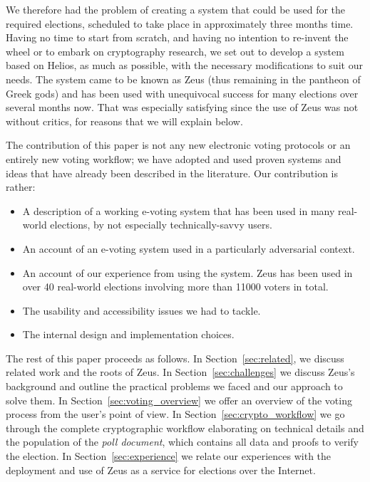 \documentclass[letterpaper,10pt]{article}
\begin{document}
We therefore had the problem of creating a system that could be used
for the required elections, scheduled to take place in approximately
three months time. Having no time to start from scratch, and having
no intention to re-invent the wheel or to embark on cryptography
research, we set out to develop a system based on Helios, as much as
possible, with the necessary modifications to suit our needs. The
system came to be known as Zeus (thus remaining in the pantheon of
Greek gods) and has been used with unequivocal success for many
elections over several months now. That was especially satisfying
since the use of Zeus was not without critics, for reasons that we
will explain below.

The contribution of this paper is not any new electronic voting
protocols or an entirely new voting workflow; we have adopted and used
proven systems and ideas that have already been described in the
literature. Our contribution is rather:
\begin{itemize}
\item A description of a working e-voting system that has been used in
  many real-world elections, by not especially technically-savvy
  users.
\item An account of an e-voting system used in a particularly
  adversarial context.
\item An account of our experience from using the system. Zeus has
  been used in over 40 real-world elections involving more than 11000
  voters in total.
\item The usability and accessibility issues we had to tackle.
\item The internal design and implementation choices.
\end{itemize}

The rest of this paper proceeds as follows. 
In Section~\ref{sec:related},
we discuss related work and the roots of Zeus.
In Section~\ref{sec:challenges} we discuss Zeus's background and outline
the practical problems we faced and our approach to solve them.
In Section~\ref{sec:voting_overview} we offer an overview of the voting
process from the user's point of view.
In Section~\ref{sec:crypto_workflow} we go through the complete
cryptographic workflow elaborating on technical details and the
population of the \emph{poll document}, which contains all data
and proofs to verify the election.
In Section~\ref{sec:experience} we relate our experiences with the
deployment and use of Zeus as a service for elections over the Internet.
\end{document}
